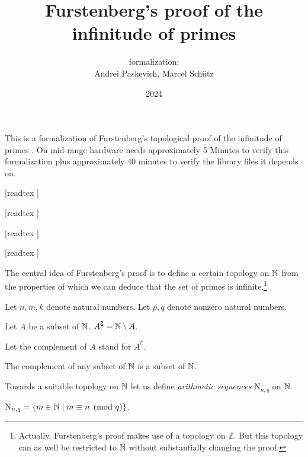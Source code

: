 \documentclass{article}
\title{Furstenberg's proof of the infinitude of primes}
\author{\Naproche formalization: \vspace{0.5em} \\
Andrei Paskevich, Marcel Schütz}
\date{2024}
\newcommand{\N}{\mathrm{N}}
\newcommand{\Int}{\mathbb{Z}}
\begin{document}
  \maketitle

  \noindent This is a formalization of Furstenberg's topological proof of the
  infinitude of primes \cite[p. 353]{Furstenberg1955}.
  On mid-range hardware \Naproche needs approximately 5 Minutes to verify this
  formalization plus approximately 40 minutes to verify the library files it
  depends on.

  \begin{forthel}
    [readtex ]

    [readtex ]

    [readtex ]

    [readtex ]
  \end{forthel}

  The central idea of Furstenberg's proof is to define a certain topology on
  $\mathbb{N}$ from the properties of which we can deduce that the set of
  primes is infinite.\footnote{Actually, Furstenberg's proof makes use of a
  topology on $\Int$. But this topology can as well be restricted to
  $\mathbb{N}$ without substantially changing the proof.}

  \begin{forthel}
    Let $n, m, k$ denote natural numbers.
    Let $p, q$ denote nonzero natural numbers.

    \begin{definition}
      Let $A$ be a subset of $\mathbb{N}$.
      $A^\complement = \mathbb{N} \setminus A$.
    \end{definition}

    Let the complement of $A$ stand for $A^\complement$.

    \begin{lemma}
      The complement of any subset of $\mathbb{N}$ is a subset of $\mathbb{N}$.
    \end{lemma}
  \end{forthel}

  Towards a suitable topology on $\mathbb{N}$ let us define \textit{arithmetic
  sequences} $\N_{n, q}$ on $\mathbb{N}$.

  \begin{forthel}
    \begin{definition}
      $\N_{n, q} = \{ m \in \Nat \mid m \equiv n \pmod{q} \}$.
    \end{definition}
  \end{forthel}
\end{document}
